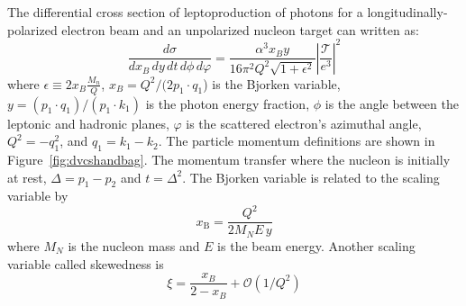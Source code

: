 The differential cross section of leptoproduction of photons for a 
longitudinally-polarized electron beam and an unpolarized nucleon target can 
written as:
\begin{equation}
\frac{d\sigma}{dx_B\,dy\,dt\,d\phi\,d\varphi} = \frac{\alpha^3 x_B y}{16 \pi^2 
   Q^2 \sqrt{1+\epsilon^2}} \left| \frac{\mathcal{T}}{e^3} \right|^2
\end{equation}
where $\epsilon \equiv 2x_B \frac{M_n}{Q}$, $x_B=Q^2/(2p_1\cdot q_1$) is the 
Bjorken variable, $y= (p_1\cdot q_1)/(p_1\cdot k_1)$ is the photon energy 
fraction, $\phi$ is the angle between the leptonic and hadronic planes, 
$\varphi$ is the scattered electron's azimuthal angle, $Q^2= -q_1^2$, and 
$q_1=k_1-k_2$. The particle momentum definitions are shown in 
Figure~\ref{fig:dvcshandbag}. The momentum transfer where the nucleon is 
initially at rest, $\Delta = p_1-p_2$ and $t=\Delta^2$. The Bjorken variable  
is related to the scaling variable by
%
\begin{equation}
   x_{\text{B}} = \frac{Q^2}{2 M_N E\,y}
\end{equation}
%
where $M_N$ is the nucleon mass and $E$ is the beam energy. Another scaling variable called skewedness is
%
\begin{equation}
\xi = \frac{x_B}{2 - x_B} + \mathcal{O}(1/Q^2)
\end{equation}

